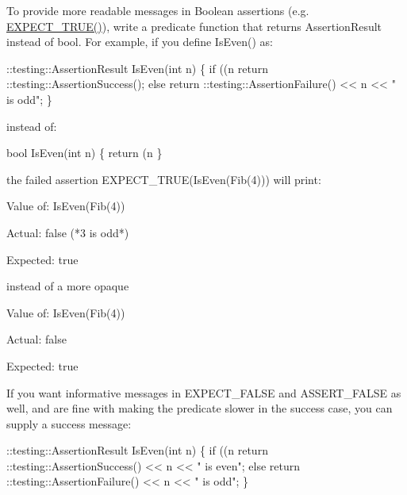 To provide more readable messages in Boolean assertions (e.\+g. {\ttfamily \hyperlink{gtest_8h_ac33e7cdfb5d44a7a0f0ab552eb5c3c6a}{E\+X\+P\+E\+C\+T\+\_\+\+T\+R\+U\+E()}}), write a predicate function that returns {\ttfamily Assertion\+Result} instead of {\ttfamily bool}. For example, if you define {\ttfamily Is\+Even()} as\+:


\begin{DoxyCode}
::testing::AssertionResult IsEven(int n) \{
  if ((n %
    return ::testing::AssertionSuccess();
  else
    return ::testing::AssertionFailure() << n << " is odd";
\}
\end{DoxyCode}


instead of\+:


\begin{DoxyCode}
bool IsEven(int n) \{
  return (n %
\}
\end{DoxyCode}


the failed assertion {\ttfamily E\+X\+P\+E\+C\+T\+\_\+\+T\+R\+UE(Is\+Even(\+Fib(4)))} will print\+:


\begin{DoxyPre}
Value of: IsEven(Fib(4))~\newline

Actual: false (*3 is odd*)~\newline

Expected: true~\newline

\end{DoxyPre}


instead of a more opaque


\begin{DoxyPre}
Value of: IsEven(Fib(4))~\newline

Actual: false~\newline

Expected: true~\newline

\end{DoxyPre}


If you want informative messages in {\ttfamily E\+X\+P\+E\+C\+T\+\_\+\+F\+A\+L\+SE} and {\ttfamily A\+S\+S\+E\+R\+T\+\_\+\+F\+A\+L\+SE} as well, and are fine with making the predicate slower in the success case, you can supply a success message\+:


\begin{DoxyCode}
::testing::AssertionResult IsEven(int n) \{
  if ((n %
    return ::testing::AssertionSuccess() << n << " is even";
  else
    return ::testing::AssertionFailure() << n << " is odd";
\}
\end{DoxyCode}


